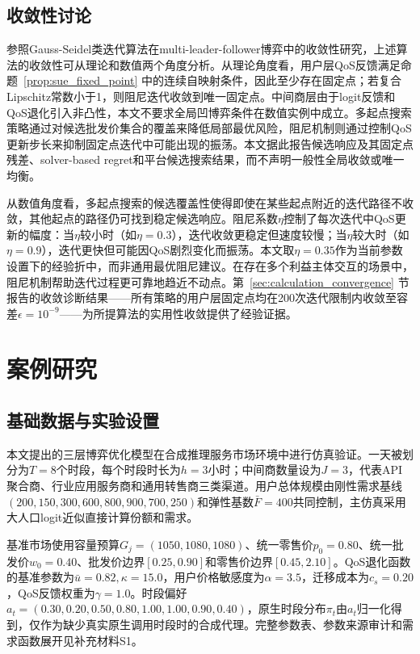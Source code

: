 \documentclass[UTF8,11pt]{ctexart}
\begin{document}
\subsection{收敛性讨论}

参照Gauss-Seidel类迭代算法在multi-leader-follower博弈中的收敛性研究\cite{wang2026hierarchical}，上述算法的收敛性可从理论和数值两个角度分析。从理论角度看，用户层QoS反馈满足命题~\ref{prop:sue_fixed_point} 中的连续自映射条件，因此至少存在固定点；若复合Lipschitz常数小于1，则阻尼迭代收敛到唯一固定点。中间商层由于logit反馈和QoS退化引入非凸性，本文不要求全局凹博弈条件在数值实例中成立。多起点搜索策略通过对候选批发价集合的覆盖来降低局部最优风险，阻尼机制则通过控制QoS更新步长来抑制固定点迭代中可能出现的振荡。本文据此报告候选响应及其固定点残差、solver-based regret和平台候选搜索结果，而不声明一般性全局收敛或唯一均衡。

从数值角度看，多起点搜索的候选覆盖性使得即使在某些起点附近的迭代路径不收敛，其他起点的路径仍可找到稳定候选响应。阻尼系数$\eta$控制了每次迭代中QoS更新的幅度：当$\eta$较小时（如$\eta=0.3$），迭代收敛更稳定但速度较慢；当$\eta$较大时（如$\eta=0.9$），迭代更快但可能因QoS剧烈变化而振荡。本文取$\eta=0.35$作为当前参数设置下的经验折中，而非通用最优阻尼建议。在存在多个利益主体交互的场景中，阻尼机制帮助迭代过程更可靠地趋近不动点。第~\ref{sec:calculation_convergence} 节报告的收敛诊断结果——所有策略的用户层固定点均在200次迭代限制内收敛至容差$\epsilon=10^{-9}$——为所提算法的实用性收敛提供了经验证据。

\section{案例研究}
\label{sec:case_study}

\subsection{基础数据与实验设置}
\label{sec:basic_data}

本文提出的三层博弈优化模型在合成推理服务市场环境中进行仿真验证。一天被划分为$T=8$个时段，每个时段时长为$h=3$小时；中间商数量设为$J=3$，代表API聚合商、行业应用服务商和通用转售商三类渠道。用户总体规模由刚性需求基线$(200,150,300,600,800,900,700,250)$和弹性基数$\bar F=400$共同控制，主仿真采用大人口logit近似直接计算份额和需求。

基准市场使用容量预算$G_j=(1050,1080,1080)$、统一零售价$p_0=0.80$、统一批发价$w_0=0.40$、批发价边界$[0.25,0.90]$和零售价边界$[0.45,2.10]$。QoS退化函数的基准参数为$\bar u=0.82,\kappa=15.0$，用户价格敏感度为$\alpha=3.5$，迁移成本为$c_s=0.20$，QoS反馈权重为$\gamma=1.0$。时段偏好$a_t=(0.30,0.20,0.50,0.80,1.00,1.00,0.90,0.40)$，原生时段分布$\pi_t$由$a_t$归一化得到，仅作为缺少真实原生调用时段时的合成代理。完整参数表、参数来源审计和需求函数展开见补充材料S1。
\end{document}

